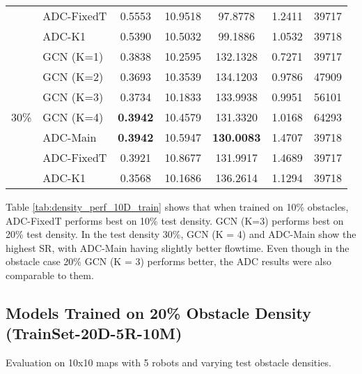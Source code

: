 \begin{table}[htbp]
\begin{tabular}{llccccc}
        & ADC-FixedT & 0.5553 & 10.9518 & 97.8778 & 1.2411 & 39717 \\
        & ADC-K1 & 0.5390 & 10.5032 & 99.1886 & 1.0532 & 39718 \\
        \midrule
        \multirow{7}{*}{30\%}
        & GCN (K=1) & 0.3838 & 10.2595 & 132.1328 & 0.7271 & 39717 \\
        & GCN (K=2) & 0.3693 & 10.3539 & 134.1203 & 0.9786 & 47909 \\
        & GCN (K=3) & 0.3734 & 10.1833 & 133.9938 & 0.9951 & 56101 \\
        & GCN (K=4) & \textbf{0.3942} & 10.4579 & 131.3320 & 1.0168 & 64293 \\
        & ADC-Main & \textbf{0.3942} & 10.5947 & \textbf{130.0083} & 1.4707 & 39718 \\
        & ADC-FixedT & 0.3921 & 10.8677 & 131.9917 & 1.4689 & 39717 \\
        & ADC-K1 & 0.3568 & 10.1686 & 136.2614 & 1.1294 & 39718 \\
        \bottomrule
    \end{tabular}
\end{table}
Table \ref{tab:density_perf_10D_train} shows that when trained on 10\% obstacles, ADC-FixedT performs best on 10\% test density. GCN (K=3) performs best on 20\% test density. In the test density 30\%, GCN (K = 4) and ADC-Main show the highest SR, with ADC-Main having slightly better flowtime. Even though in the obstacle case 20\% GCN (K = 3) performs better, the ADC results were also comparable to them.
\newpage

\subsection{Models Trained on 20\% Obstacle Density (TrainSet-20D-5R-10M)}
\label{subsec:perf_20D_train_detailed}
Evaluation on 10x10 maps with 5 robots and varying test obstacle densities.

